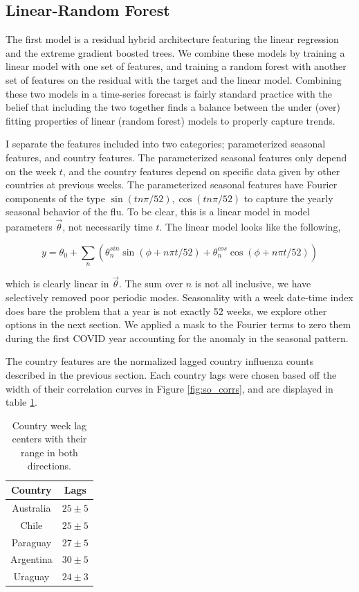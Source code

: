 \documentclass[12pt,a4paper,english]{article}
\begin{document}
\subsection{Linear-Random Forest}

The first model is a residual hybrid architecture featuring the linear regression and the extreme gradient boosted trees. We combine these models by training a linear model with one set of features, and training a random forest with another set of features on the residual with the target and the linear model. Combining these two models in a time-series forecast is fairly standard practice with the belief that including the two together finds a balance between the under (over) fitting properties of linear (random forest) models to properly capture trends.

I separate the features included into two categories; parameterized seasonal features, and country features. The parameterized seasonal features only depend on the week $t$, and the country features depend on specific data given by other countries at previous weeks. The parameterized seasonal features have Fourier components of the type $\sin(t n\pi/52),\cos(t n\pi/52)$ to capture the yearly seasonal behavior of the flu. To be clear, this is a linear model in model parameters $\vec{\theta}$, not necessarily time $t$. The linear model looks like the following,

\begin{equation}
y = \theta_0 + \sum_n\left( \theta^{sin}_n\sin(\phi + n\pi t/52)+\theta^{cos}_n\cos(\phi+n\pi t/52)\right)
\end{equation}

which is clearly linear in $\vec{\theta}$. The sum over $n$ is not all inclusive, we have selectively removed poor periodic modes. Seasonality with a week date-time index does bare the problem that a year is not exactly 52 weeks, we explore other options in the next section. We applied a mask to the Fourier terms to zero them during the first COVID year accounting for the anomaly in the seasonal pattern.

The country features are the normalized lagged country influenza counts described in the previous section. Each country lags were chosen based off the width of their correlation curves in Figure \ref{fig:so_corrs}, and are displayed in table \ref{tab:lags}.

\begin{table}[h!]
\begin{tabular}{cc}
Country & Lags \\
\hline
Australia & $25\pm 5$ \\
Chile & $25\pm 5$ \\
Paraguay & $27\pm 5$\\
Argentina &$ 30\pm5$ \\
Uraguay &$ 24\pm 3$
\end{tabular}
\label{tab:lags}
\caption{Country week lag centers with their range in both directions.}
\end{table}
\end{document}

